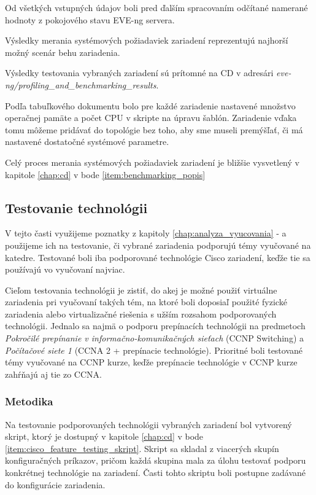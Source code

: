 Od všetkých vstupných údajov boli pred ďalším spracovaním odčítané namerané hodnoty z pokojového stavu EVE-ng servera.

Výsledky merania systémových požiadaviek zariadení reprezentujú najhorší možný scenár behu zariadenia.

Výsledky testovania vybraných zariadení sú prítomné na CD v adresári \emph{eve-ng/profiling\_and\_benchmarking\_results}.

Podľa tabuľkového dokumentu bolo pre každé zariadenie nastavené množstvo operačnej pamäte a počet CPU v skripte na úpravu šablón. Zariadenie vďaka tomu môžeme pridávať do topológie bez toho, aby sme museli premýšľať, či má nastavené dostatočné systémové parametre.

Celý proces merania systémových požiadaviek zariadení je bližšie vysvetlený v kapitole \ref{chap:cd} v bode \ref{item:benchmarking_popis}





\subsection{Testovanie technológii}
\label{chap:testovanie_technologii}

V tejto časti využijeme poznatky z kapitoly \ref{chap:analyza_vyucovania} -  a použijeme ich na testovanie, či vybrané zariadenia podporujú témy vyučované na katedre. Testované boli iba podporované technológie Cisco zariadení, keďže tie sa používajú vo vyučovaní najviac.

Cieľom testovania technológii je zistiť, do akej je možné použiť virtuálne zariadenia pri vyučovaní takých tém, na ktoré boli doposiaľ použité fyzické zariadenia alebo virtualizačné riešenia s užším rozsahom podporovaných technológii. Jednalo sa najmä o podporu prepínacích technológii na predmetoch \emph{Pokročilé prepínanie v informačno-komunikačných sieťach} (CCNP Switching) a \emph{Počítačové siete 1} (CCNA 2 + prepínacie technológie). Prioritné boli testované témy vyučované na CCNP kurze, keďže prepínacie technológie v CCNP kurze zahŕňajú aj tie zo CCNA.





\subsubsection{Metodika}

Na testovanie podporovaných technológii vybraných zariadení bol vytvorený skript, ktorý je dostupný v kapitole \ref{chap:cd} v bode \ref{item:cisco_feature_testing_skript}. Skript sa skladal z viacerých skupín konfiguračných príkazov, pričom každá skupina mala za úlohu testovať podporu konkrétnej technológie na zariadení. Časti tohto skriptu boli postupne zadávané do konfigurácie zariadenia.




